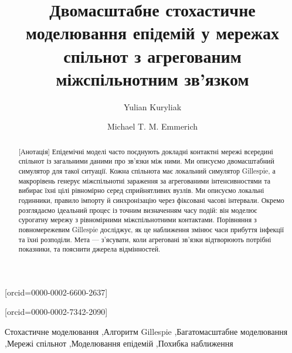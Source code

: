 \documentclass[a4paper,fleqn]{cas-sc}
\begin{document}
\let\WriteBookmarks\relax
{}

\title[mode=title]{Двомасштабне стохастичне моделювання епідемій у мережах спільнот з агрегованим міжспільнотним зв'язком}

\author[1]{Yulian Kuryliak}[orcid=0000-0002-6600-2637]
\cormark[1]

\author[2]{Michael T. M. Emmerich}[orcid=0000-0002-7342-2090]



\begin{abstract}[Анотація]
Епідемічні моделі часто поєднують докладні контактні мережі всередині спільнот із загальними даними про зв'язки між ними. Ми описуємо двомасштабний симулятор для такої ситуації. Кожна спільнота має локальний симулятор Gillespie, а макрорівень генерує міжспільнотні зараження за агрегованими інтенсивностями та вибирає їхні цілі рівномірно серед сприйнятливих вузлів. Ми описуємо локальні годинники, правило імпорту й синхронізацію через фіксовані часові інтервали. Окремо розглядаємо ідеальний процес із точним визначенням часу подій: він моделює сурогатну мережу з рівномірними міжспільнотними контактами. Порівняння з повномережевим Gillespie досліджує, як це наближення змінює часи прибуття інфекції та їхні розподіли. Мета --- з'ясувати, коли агреговані зв'язки відтворюють потрібні показники, та пояснити джерела відмінностей.
\end{abstract}
\begin{keywords}
Стохастичне моделювання \sep Алгоритм Gillespie \sep Багатомасштабне моделювання \sep Мережі спільнот \sep Моделювання епідемій \sep Похибка наближення
\end{keywords}
\maketitle
\end{document}

